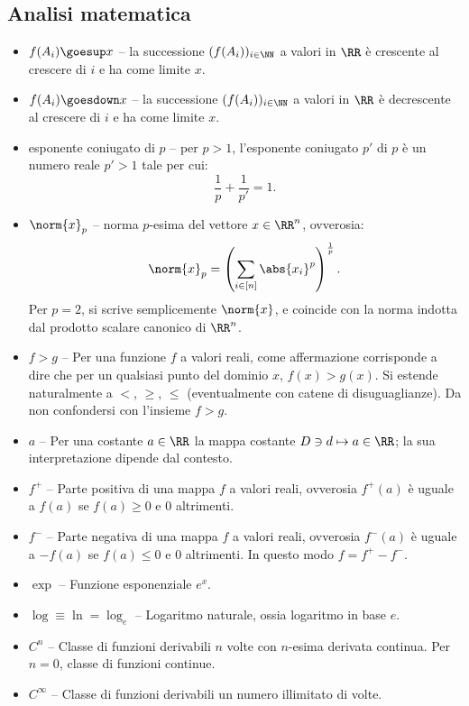 \begin{multicols*}{2}
    \section*{Analisi matematica}

    \begin{itemize}
        \item $f(A_i) \goesup x$ -- la successione $(f(A_i))_{i \in \NN}$ a valori
        in $\RR$ è crescente al crescere di $i$ e ha come limite $x$.
        \item $f(A_i) \goesdown x$ -- la successione $(f(A_i))_{i \in \NN}$ a valori
        in $\RR$ è decrescente al crescere di $i$ e ha come limite $x$.
        \item esponente coniugato di $p$ -- per $p > 1$, l'esponente coniugato
        $p'$ di $p$ è un numero reale $p' > 1$ tale per cui:
        \[
            \frac{1}{p} + \frac{1}{p'} = 1.
        \]
        \item $\norm{x}_p$ -- norma $p$-esima del vettore $x \in \RR^n$, ovverosia:
        \[
            \norm{x}_p = \left(\sum_{i \in [n]} \abs{x_i}^p\right)^\frac{1}{p}.
        \]
        Per $p = 2$, si scrive semplicemente $\norm{x}$, e coincide con la norma
        indotta dal prodotto scalare canonico di $\RR^n$.
        \item $f > g$ -- Per una funzione $f$ a valori reali, come affermazione
        corrisponde a dire che per un qualsiasi punto del dominio $x$, $f(x) > g(x)$. Si estende naturalmente a $<$, $\geq$, $\leq$ (eventualmente con
        catene di disuguaglianze). Da non
        confondersi con l'insieme $f > g$.
        \item $a$ -- Per una costante $a \in \RR$ la mappa costante $D \ni d \mapsto a \in \RR$;
        la sua interpretazione dipende dal contesto.
        \item $f^+$ -- Parte positiva di una mappa $f$ a valori reali, ovverosia
        $f^+(a)$ è uguale a $f(a)$ se $f(a) \geq 0$ e $0$ altrimenti.
        \item $f^-$ -- Parte negativa di una mappa $f$ a valori reali, ovverosia
        $f^-(a)$ è uguale a $-f(a)$ se $f(a) \leq 0$ e $0$ altrimenti. In questo
        modo $f = f^+ - f^-$.
        \item $\exp$ -- Funzione esponenziale $e^x$.
        \item $\log \equiv \ln = \log_e$ -- Logaritmo naturale, ossia logaritmo in base $e$.
        \item $C^n$ -- Classe di funzioni derivabili $n$ volte con $n$-esima derivata continua. Per $n = 0$, classe di funzioni continue.
        \item $C^\infty$ -- Classe di funzioni derivabili un numero illimitato di volte.
    \end{itemize}


\end{multicols*}
